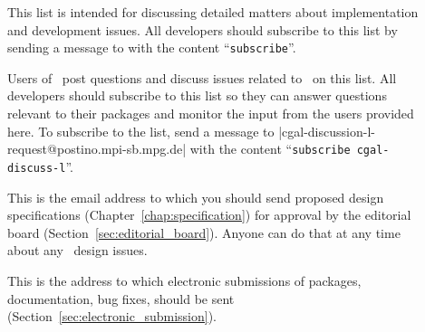 \begin{description}
\item[] 
     This list is intended for discussing detailed matters 
     about implementation and development issues.  All developers should 
     subscribe to this list by sending a message to
     with the content ``\texttt{subscribe}''. 

\item[] 
     Users of \cgal\ post questions and discuss issues
     related to \cgal\ on this list.  All developers should subscribe to this 
     list so they can answer questions relevant to their packages and monitor 
     the input from the users provided here. 
     To subscribe to the list, send a message to
     {\nonlinkedpath|cgal-discussion-l-request@postino.mpi-sb.mpg.de|}
     with the content ``\texttt{subscribe cgal-discuss-l}''.

\item[] 
     This is the email address to which you should
     send proposed design specifications (Chapter~\ref{chap:specification})
     for approval by the editorial 
     board (Section~\ref{sec:editorial_board}). Anyone can do that 
     at any time about any \cgal\ design issues. 

\item[] This is the address to which electronic
     submissions of packages, documentation, bug fixes, \etc should
     be sent (Section~\ref{sec:electronic_submission}).
\end{description}
